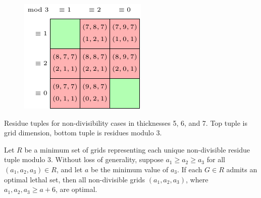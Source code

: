 \begin{table}[]
\begin{subfigure}{0.3\textwidth}
	\label{tab:r_b}
\end{subfigure} \hfill%
\begin{subfigure}{0.3\textwidth}
	\includegraphics[width=\textwidth]{tables/4/residue_1.pdf}
	\label{tab:r_c}
\end{subfigure}
\caption{Residue tuples for non-divisibility cases in thicknesses 5, 6, and 7. Top tuple is grid dimension, bottom tuple is residues modulo 3.}
\label{tab:residues}
\end{table} 

\begin{lem}
Let $R$ be a minimum set of grids representing each unique non-divisible residue tuple modulo 3. Without loss of generality, suppose $a_1 \geq a_2 \geq a_3$ for all $(a_1,a_2,a_3) \in R$, and let $a$ be the minimum value of $a_3$. If each $G \in R$ admits an optimal lethal set, then all non-divisible grids $(a_1,a_2,a_3)$, where $a_1, a_2, a_3 \geq a+6$, are optimal.
\end{lem}




